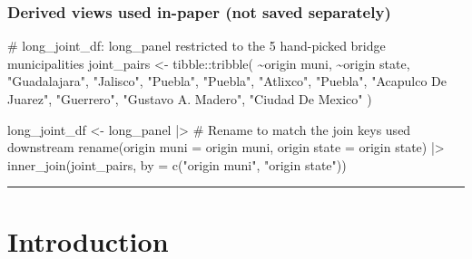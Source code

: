 \documentclass[
  11pt,
  letterpaper,
  DIV=11,
  numbers=noendperiod]{scrartcl}
\newenvironment{Shaded}{}{}
\newcommand{\AttributeTok}[1]{\textcolor[rgb]{0.84,0.23,0.29}{#1}}
\newcommand{\CommentTok}[1]{\textcolor[rgb]{0.42,0.45,0.49}{#1}}
\newcommand{\FunctionTok}[1]{\textcolor[rgb]{0.44,0.26,0.76}{#1}}
\newcommand{\NormalTok}[1]{\textcolor[rgb]{0.14,0.16,0.18}{#1}}
\newcommand{\OtherTok}[1]{\textcolor[rgb]{0.44,0.26,0.76}{#1}}
\newcommand{\SpecialCharTok}[1]{\textcolor[rgb]{0.00,0.36,0.77}{#1}}
\newcommand{\StringTok}[1]{\textcolor[rgb]{0.01,0.18,0.38}{#1}}
\begin{document}
\subsubsection{Derived views used in-paper (not saved
separately)}\label{derived-views-used-in-paper-not-saved-separately}

\begin{Shaded}
\begin{Highlighting}[]
\CommentTok{\# long\_joint\_df: long\_panel restricted to the 5 hand{-}picked bridge municipalities}
\NormalTok{joint\_pairs }\OtherTok{\textless{}{-}}\NormalTok{ tibble}\SpecialCharTok{::}\FunctionTok{tribble}\NormalTok{(}
  \SpecialCharTok{\textasciitilde{}}\StringTok{\textasciigrave{}}\AttributeTok{origin muni}\StringTok{\textasciigrave{}}\NormalTok{,        }\SpecialCharTok{\textasciitilde{}}\StringTok{\textasciigrave{}}\AttributeTok{origin state}\StringTok{\textasciigrave{}}\NormalTok{,}
  \StringTok{"Guadalajara"}\NormalTok{,         }\StringTok{"Jalisco"}\NormalTok{,}
  \StringTok{"Puebla"}\NormalTok{,              }\StringTok{"Puebla"}\NormalTok{,}
  \StringTok{"Atlixco"}\NormalTok{,             }\StringTok{"Puebla"}\NormalTok{,}
  \StringTok{"Acapulco De Juarez"}\NormalTok{,  }\StringTok{"Guerrero"}\NormalTok{,}
  \StringTok{"Gustavo A. Madero"}\NormalTok{,   }\StringTok{"Ciudad De Mexico"}
\NormalTok{)}

\NormalTok{long\_joint\_df }\OtherTok{\textless{}{-}}\NormalTok{ long\_panel }\SpecialCharTok{|\textgreater{}}
  \CommentTok{\# Rename to match the join keys used downstream}
  \FunctionTok{rename}\NormalTok{(}\StringTok{\textasciigrave{}}\AttributeTok{origin muni}\StringTok{\textasciigrave{}} \OtherTok{=} \StringTok{\textasciigrave{}}\AttributeTok{origin muni}\StringTok{\textasciigrave{}}\NormalTok{,}
         \StringTok{\textasciigrave{}}\AttributeTok{origin state}\StringTok{\textasciigrave{}} \OtherTok{=} \StringTok{\textasciigrave{}}\AttributeTok{origin state}\StringTok{\textasciigrave{}}\NormalTok{) }\SpecialCharTok{|\textgreater{}}
  \FunctionTok{inner\_join}\NormalTok{(joint\_pairs, }\AttributeTok{by =} \FunctionTok{c}\NormalTok{(}\StringTok{"origin muni"}\NormalTok{, }\StringTok{"origin state"}\NormalTok{))}
\end{Highlighting}
\end{Shaded}

\begin{center}\rule{0.5\linewidth}{0.5pt}\end{center}

\section{Introduction}\label{introduction}
\end{document}
